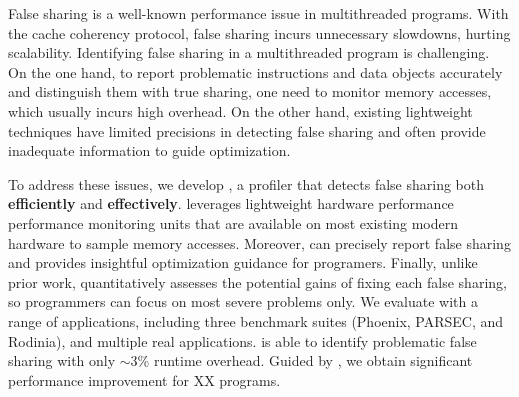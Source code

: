 False sharing is a well-known performance issue in multithreaded programs. With the cache coherency protocol, false sharing incurs unnecessary slowdowns, hurting scalability. Identifying false sharing in a multithreaded program is challenging. On the one hand, to report problematic instructions and data objects accurately and distinguish them with true sharing, one need to monitor memory accesses, which usually incurs high overhead. On the other hand, existing lightweight techniques have limited precisions in detecting false sharing and often provide inadequate information to guide optimization.

\sloppy
To address these issues, we develop \cheetah{}, a profiler that detects false sharing both {\bf efficiently} and {\bf effectively}. \cheetah{} leverages lightweight hardware performance performance monitoring units that are available on most existing modern hardware to sample memory accesses. Moreover, \cheetah{} can precisely report false sharing and provides insightful optimization guidance for programers. Finally,
unlike prior work, \cheetah{} quantitatively assesses the potential gains of fixing each false sharing, so programmers can focus on most severe problems only. %
We evaluate \cheetah{} with a range of applications, including three benchmark suites (Phoenix, PARSEC, and Rodinia), and multiple real applications. \Cheetah{} is able to identify problematic false sharing with only  $\sim$3\% runtime overhead. Guided by \Cheetah{}, we obtain significant performance improvement for XX programs.
